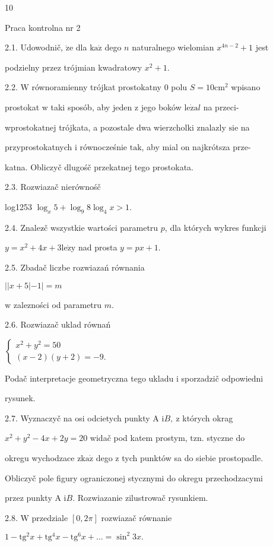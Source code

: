 \documentclass[a4paper,12pt]{article}
\begin{document}
10

Praca kontrolna nr 2

2.1. Udowodnič, $\dot{\mathrm{z}}\mathrm{e}$ dla $\mathrm{k}\mathrm{a}\dot{\mathrm{z}}$ dego $n$ naturalnego wielomian $x^{4n-2}+1$ jest

podzielny przez trójmian kwadratowy $x^{2}+1.$

2.2. $\mathrm{W}$ równoramienny trójkat prostokatny $0$ polu $S = 10\mathrm{c}\mathrm{m}^{2}$ wpisano

prostokat $\mathrm{w}$ taki sposób, aby jeden $\mathrm{z}$ jego boków $\mathrm{l}\mathrm{e}\dot{\mathrm{z}}\mathrm{a}l$ na przeci-

wprostokatnej trójkata, a pozostale dwa wierzcholki znalazly $\mathrm{s}\mathrm{i}\mathrm{e}$ na

przyprostokatnych $\mathrm{i}$ równocześnie $\mathrm{t}\mathrm{a}\mathrm{k}$, aby mial on najkrótsza prze-

katna. Obliczyč dlugośč przekatnej tego prostokata.

2.3. Rozwiazač nierównośč

log1253 $\log_{x}5+\log_{9}8\log_{4}x>1.$

2.4. Znalez$\acute{}$č wszystkie wartości parametru $p$, dla których wykres funkcji

$y=x^{2}+4x+3\mathrm{l}\mathrm{e}\dot{\mathrm{z}}\mathrm{y}$ nad prosta $y=px+1.$

2.5. Zbadač liczbe rozwiazań równania

$||x+5|-1|=m$

$\mathrm{w}$ zalezności od parametru $m.$

2.6. Rozwiazač uklad równań

$\left\{\begin{array}{l}
x^{2}+y^{2}=50\\
(x-2)(y+2)=-9.
\end{array}\right.$

Podač interpretacje geometryczna tego ukladu $\mathrm{i}$ sporzadzič odpowiedni

rysunek.

2.7. Wyznaczyč na osi odcietych punkty A $\mathrm{i} B,\ \mathrm{z}$ których okrag

$x^{2}+y^{2}-4x+2y= 20$ widač pod katem prostym, $\mathrm{t}\mathrm{z}\mathrm{n}$. styczne do

okregu wychodzace $\mathrm{z}\mathrm{k}\mathrm{a}\dot{\mathrm{z}}$ dego $\mathrm{z}$ tych punktów sa do siebie prostopadle.

Obliczyč pole figury ograniczonej stycznymi do okregu przechodzacymi

przez punkty A $\mathrm{i}B$. Rozwiazanie zilustrowač rysunkiem.

2.8. $\mathrm{W}$ przedziale $[0,2\pi]$ rozwiazač równanie

$1-\mathrm{t}\mathrm{g}^{2}x+\mathrm{t}\mathrm{g}^{4}x-\mathrm{t}\mathrm{g}^{6}x+\ldots=\sin^{2}3x.$
\end{document}
